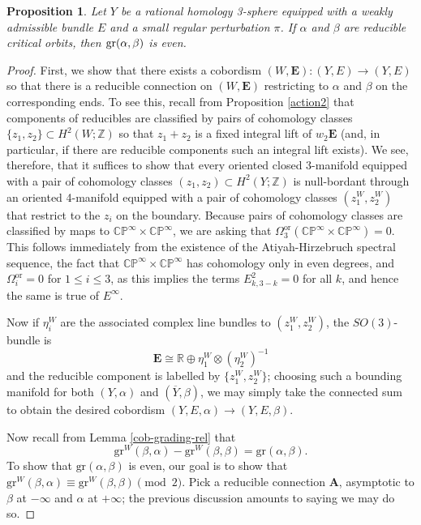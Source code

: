 \documentclass[10pt,a4paper]{amsart}
\newtheorem{proposition}[theorem]{Proposition}
\theoremstyle{definition}
\theoremstyle{remark}
\numberwithin{figure}{qchap}
\begin{document}
\begin{proposition}\label{gr-red}Let $Y$ be a rational homology 3-sphere equipped with a weakly admissible bundle $E$ and a small regular perturbation $\pi$. If $\alpha$ and $\beta$ are reducible critical orbits, then $\textup{gr}(\alpha, \beta)$ is even.
\end{proposition}
\begin{proof}First, we show that there exists a cobordism $(W,\mathbf{E}): (Y, E) \to (Y, E)$ so that there is a reducible connection on $(W,\mathbf{E})$ restricting to $\alpha$ and $\beta$ on the corresponding ends. To see this, recall from Proposition \ref{action2} that components of reducibles are classified by pairs of cohomology classes $\{z_1, z_2\} \subset H^2(W;\mathbb Z)$ so that $z_1 + z_2$ is a fixed integral lift of $w_2 \mathbf{E}$ (and, in particular, if there are reducible components such an integral lift exists). We see, therefore, that it suffices to show that every oriented closed $3$-manifold equipped with a pair of cohomology classes $(z_1, z_2) \subset H^2(Y;\mathbb Z)$ is null-bordant through an oriented 4-manifold equipped with a pair of cohomology classes $(z_1^W, z_2^W)$ that restrict to the $z_i$ on the boundary. Because pairs of cohomology classes are classified by maps to $\mathbb{CP}^\infty \times \mathbb{CP}^\infty$, we are asking that $\Omega_3^{\text{or}}(\mathbb{CP}^\infty \times \mathbb{CP}^\infty) = 0$. This follows immediately from the existence of the Atiyah-Hirzebruch spectral sequence, the fact that $\mathbb{CP}^\infty \times \mathbb{CP}^\infty$ has cohomology only in even degrees, and $\Omega_i^{\text{or}} = 0$ for $1 \leq i \leq 3$, as this implies the terms $E^2_{k, 3-k} = 0$ for all $k$, and hence the same is true of $E^\infty$.

Now if $\eta_i^W$ are the associated complex line bundles to $(z_1^W, z_2^W)$, the $SO(3)$-bundle is 
$$\mathbf{E} \cong \mathbb R \oplus \eta_1^W \otimes (\eta_2^W)^{-1}$$
and the reducible component is labelled by $\{z_1^W, z_2^W\}$; choosing such a bounding manifold for both $(Y,\alpha)$ and $(\overline Y, \beta)$, we may simply take the connected sum to obtain the desired cobordism $(Y,E,\alpha) \to (Y,E,\beta)$.

Now recall from Lemma \ref{cob-grading-rel} that $$\text{gr}^W(\beta, \alpha) - \text{gr}^W(\beta, \beta) =  \text{gr}(\alpha, \beta).$$
To show that $\text{gr}(\alpha, \beta)$ is even, our goal is to show that $\text{gr}^W(\beta, \alpha) \equiv \text{gr}^W(\beta, \beta) \pmod 2.$ Pick a reducible connection $\mathbf{A}$, asymptotic to $\beta$ at $-\infty$ and $\alpha$ at $+\infty$; the previous discussion amounts to saying we may do so.


\end{proof}
\end{document}
